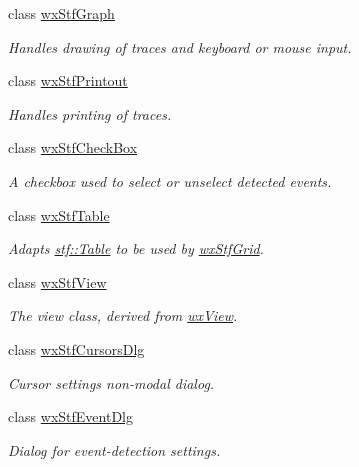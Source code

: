 \begin{DoxyCompactItemize}
class \hyperlink{classwxStfGraph}{wxStfGraph}
\begin{DoxyCompactList}\small\item\em Handles drawing of traces and keyboard or mouse input. \item\end{DoxyCompactList}\item 
class \hyperlink{classwxStfPrintout}{wxStfPrintout}
\begin{DoxyCompactList}\small\item\em Handles printing of traces. \item\end{DoxyCompactList}\item 
class \hyperlink{classwxStfCheckBox}{wxStfCheckBox}
\begin{DoxyCompactList}\small\item\em A checkbox used to select or unselect detected events. \item\end{DoxyCompactList}\item 
class \hyperlink{classwxStfTable}{wxStfTable}
\begin{DoxyCompactList}\small\item\em Adapts \hyperlink{classstf_1_1Table}{stf::Table} to be used by \hyperlink{classwxStfGrid}{wxStfGrid}. \item\end{DoxyCompactList}\item 
class \hyperlink{classwxStfView}{wxStfView}
\begin{DoxyCompactList}\small\item\em The view class, derived from \hyperlink{classwxView}{wxView}. \item\end{DoxyCompactList}\item 
class \hyperlink{classwxStfCursorsDlg}{wxStfCursorsDlg}
\begin{DoxyCompactList}\small\item\em Cursor settings non-\/modal dialog. \item\end{DoxyCompactList}\item 
class \hyperlink{classwxStfEventDlg}{wxStfEventDlg}
\begin{DoxyCompactList}\small\item\em Dialog for event-\/detection settings. \item\end{DoxyCompactList}\item 

\end{DoxyCompactItemize}
